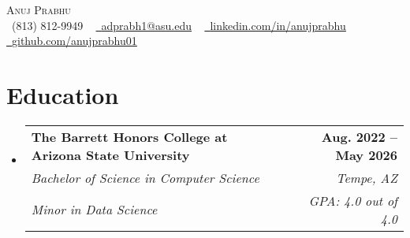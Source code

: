 \documentclass[letterpaper,11pt]{article}
\makeatletter
\newcommand{\resumeSubHeadingListStart}{\begin{itemize}[leftmargin=0.0in, label={}]}
\newcommand{\resumeSubHeadingListEnd}{\end{itemize}}
\newcommand{\resumeSubheadingEdu}[6]{
  \vspace{-2pt}\item
    \begin{tabular*}{1.0\textwidth}[t]{l@{\extracolsep{\fill}}r}
      \textbf{#1} & \textbf{\small #2} \\
      \textit{\small#3} & \textit{\small #4} \\
      \textit{\small#5} & \textit{\small #6} \\
    \end{tabular*}\vspace{-7pt}
}
\makeatother
\begin{document}

\begin{center}
    {\Huge \scshape Anuj Prabhu} \\ \vspace{1pt}
    \small \raisebox{-0.1\height}\faPhone\ (813) 812-9949 ~ \href{mailto:adprabh1@asu.edu}{\raisebox{-0.2\height}\faEnvelope\  \underline{adprabh1@asu.edu}} ~ 
    \href{https://www.linkedin.com/in/anujprabhu/}{\raisebox{-0.2\height}\faLinkedin\ \underline{linkedin.com/in/anujprabhu}}  ~
    \href{https://github.com/anujprabhu01}{\raisebox{-0.2\height}\faGithub\ \underline{github.com/anujprabhu01}} ~ {\raisebox{-0.2\height}\faFlag\ \raisebox{-0.2\height}{U.S. Citizen}}
    \vspace{-8pt}
\end{center}


\section{Education}
  \resumeSubHeadingListStart
    \resumeSubheadingEdu
    {The Barrett Honors College at Arizona State University}{Aug. 2022 -- May 2026}
      {Bachelor of Science in Computer Science}{Tempe, AZ}
      {Minor in Data Science}{GPA: 4.0 out of 4.0}
  \resumeSubHeadingListEnd

\end{document}
